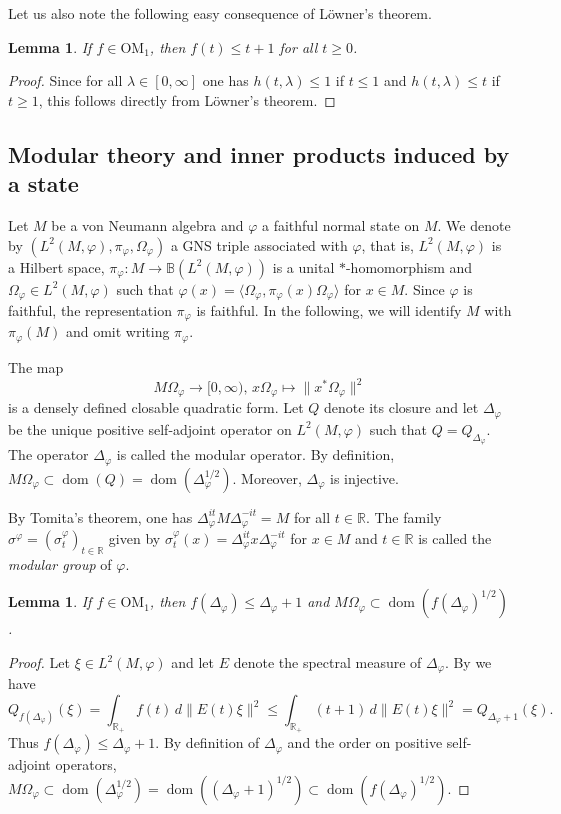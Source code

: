 \documentclass[a4paper,12pt]{amsart}
\newcommand{\norm}[1]{\lVert#1\rVert}
\newcommand{\OM}{\mathrm{OM}}
\renewcommand{\phi}{\varphi}
\newcommand{\dom}{\operatorname{dom}}
\newcommand{\IR}{\mathbb R}
\theoremstyle{plain}
\newtheorem{lemma}[proposition]{Lemma}
\theoremstyle{remark}
\theoremstyle{definition}
\begin{document}
Let us also note the following easy consequence of Löwner's theorem.

\begin{lemma}\label{lem:bound_OM}
    If $f\in\OM_1$, then $f(t)\leq t+1$ for all $t\geq 0$.
\end{lemma}
\begin{proof}
    Since for all $\lambda\in [0,\infty]$ one has $h(t,\lambda)\leq 1$ if $t\leq 1$ and $h(t,\lambda)\leq t$ if $t\geq 1$, this follows directly from Löwner's theorem.
\end{proof}

\subsection{Modular theory and inner products induced by a state}

Let $M$ be a von Neumann algebra and $\phi$ a faithful normal state on $M$. We denote by $(L^2(M,\phi),\pi_\phi,\Omega_\phi)$ a GNS triple associated with $\phi$, that is, $L^2(M,\phi)$ is a Hilbert space, $\pi_\phi\colon M\to \mathbb B(L^2(M,\phi))$ is a unital $\ast$-homomorphism and $\Omega_\phi\in L^2(M,\phi)$ such that $\phi(x)=\langle \Omega_\phi,\pi_\phi(x)\Omega_\phi\rangle$ for $x\in M$. Since $\phi$ is faithful, the representation $\pi_\phi$ is faithful. In the following, we will identify $M$ with $\pi_\phi(M)$ and omit writing $\pi_\phi$.

The map
\begin{equation*}
    M\Omega_\phi\to [0,\infty),\,x\Omega_\phi\mapsto \norm{x^\ast\Omega_\phi}^2
\end{equation*}
is a densely defined closable quadratic form. Let $Q$ denote its closure and let $\Delta_\phi$ be the unique positive self-adjoint operator on $L^2(M,\phi)$ such that $Q=Q_{\Delta_\phi}$. The operator $\Delta_\phi$ is called the modular operator. By definition, $M\Omega_\phi\subset \dom(Q)=\dom(\Delta_\phi^{1/2})$. Moreover, $\Delta_\phi$ is injective.

By Tomita's theorem, one has $\Delta_\phi^{it}M\Delta_\phi^{-it}=M$ for all $t\in \IR$. The family $\sigma^\phi=(\sigma^\phi_t)_{t\in \IR}$ given by $\sigma^\phi_t(x)=\Delta_\phi^{it}x\Delta_\phi^{-it}$ for $x\in M$ and $t\in\IR$ is called the \emph{modular group} of $\phi$.

\begin{lemma}
    If $f\in\OM_1$, then $f(\Delta_\phi)\leq \Delta_\phi+1$ and $M\Omega_\phi\subset \dom(f(\Delta_\phi)^{1/2})$.
\end{lemma}
\begin{proof}
    Let $\xi\in L^2(M,\phi)$ and let $E$ denote the spectral measure of $\Delta_\phi$. By  we have
    \begin{equation*}
        Q_{f(\Delta_\phi)}(\xi)=\int_{\IR_+}f(t)\,d\norm{E(t)\xi}^2\leq \int_{\IR_+}(t+1)\,d\norm{E(t)\xi}^2=Q_{\Delta_\phi+1}(\xi).
    \end{equation*}
    Thus $f(\Delta_\phi)\leq \Delta_\phi+1$. By definition of $\Delta_\phi$ and the order on positive self-adjoint operators, $M\Omega_\phi\subset \dom(\Delta_\phi^{1/2})=\dom((\Delta_\phi+1)^{1/2})\subset \dom(f(\Delta_\phi)^{1/2})$.
\end{proof}
\end{document}
